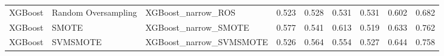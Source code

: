 \begin{tabular}{lllllllll}
                     XGBoost & Random Oversampling &                           XGBoost\_narrow\_ROS & 0.523 &                     0.528 &                 0.531 &                  0.531 &                                   0.602 &     0.682 \\
                     XGBoost &               SMOTE &                         XGBoost\_narrow\_SMOTE & 0.577 &                     0.541 &                 0.613 &                  0.519 &                                   0.633 &     0.762 \\
                     XGBoost &            SVMSMOTE &                      XGBoost\_narrow\_SVMSMOTE & 0.526 &                     0.564 &                 0.554 &                  0.527 &                                   0.644 &     0.758 \\
\bottomrule
\end{tabular}
